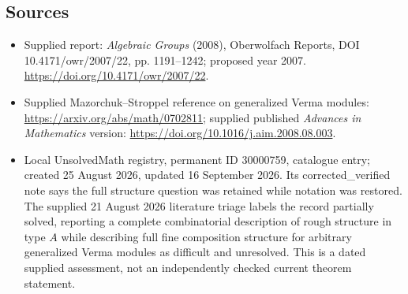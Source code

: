 \documentclass[11pt]{article}
\begin{document}
\subsection{Sources}
\begin{itemize}
\item Supplied report: \emph{Algebraic Groups} (2008), Oberwolfach Reports, DOI 10.4171/owr/2007/22, pp. 1191--1242; proposed year 2007. \url{https://doi.org/10.4171/owr/2007/22}.
\item Supplied Mazorchuk--Stroppel reference on generalized Verma modules: \url{https://arxiv.org/abs/math/0702811}; supplied published \emph{Advances in Mathematics} version: \url{https://doi.org/10.1016/j.aim.2008.08.003}.
\item Local UnsolvedMath registry, permanent ID 30000759, catalogue entry; created 25 August 2026, updated 16 September 2026. Its corrected\_verified note says the full structure question was retained while notation was restored. The supplied 21 August 2026 literature triage labels the record partially solved, reporting a complete combinatorial description of rough structure in type $A$ while describing full fine composition structure for arbitrary generalized Verma modules as difficult and unresolved. This is a dated supplied assessment, not an independently checked current theorem statement.
\end{itemize}
\end{document}
